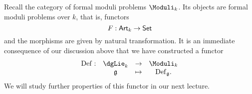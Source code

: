 \documentclass[11pt]{amsart}
\begin{document}
Recall the category of formal moduli problems $\Moduli_k$. 
Its objects are formal moduli problems over $k$, that is, functors
\[
F : {\sf Art}_k \to {\sf Set}
\]
and the morphisms are given by natural transformation. 
It is an immediate consequence of our discussion above that we have constructed a functor
\[
\begin{array}{cccc}
\Def : & \dgLie_k & \to & \Moduli_k \\
& \fg & \mapsto & \Def_\fg .
\end{array}
\] 
We will study further properties of this functor in our next lecture.
\end{document}

